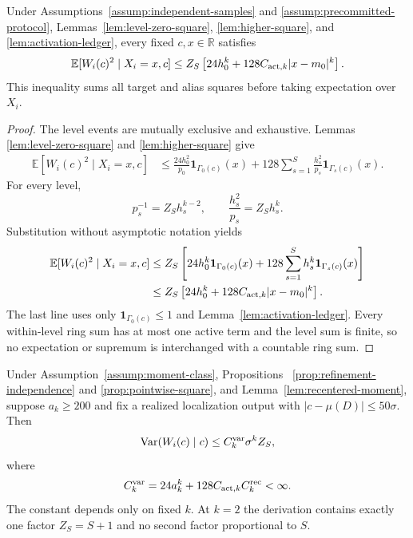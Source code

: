 \begin{proposition}
\label{prop:pointwise-square}
Under Assumptions~\ref{assump:independent-samples} and
\ref{assump:precommitted-protocol}, Lemmas~\ref{lem:level-zero-square},
\ref{lem:higher-square}, and \ref{lem:activation-ledger}, every fixed
$c,x\in\mathbb R$ satisfies
\[
 \mathbb E[W_i(c)^2\mid X_i=x,c]
 \leq Z_S\left[24h_0^k+128C_{{\rm act},k}|x-m_0|^k\right].
\]
This inequality sums all target and alias squares before taking expectation
over $X_i$.
\end{proposition}

\begin{proof}
The level events are mutually exclusive and exhaustive.  Lemmas~
\ref{lem:level-zero-square} and \ref{lem:higher-square} give
\[
\begin{aligned}
 \mathbb E[W_i(c)^2\mid X_i=x,c]
 &\leq\frac{24h_0^2}{p_0}\mathbf1_{\Gamma_0(c)}(x)
 +128\sum_{s=1}^S\frac{h_s^2}{p_s}
   \mathbf1_{\Gamma_s(c)}(x).
\end{aligned}
\]
For every level,
\[
 p_s^{-1}=Z_Sh_s^{k-2},
 \qquad \frac{h_s^2}{p_s}=Z_Sh_s^k.
\]
Substitution without asymptotic notation yields
\[
\begin{aligned}
 \mathbb E[W_i(c)^2\mid X_i=x,c]
 &\leq Z_S\left[24h_0^k\mathbf1_{\Gamma_0(c)}(x)
 +128\sum_{s=1}^S h_s^k\mathbf1_{\Gamma_s(c)}(x)\right]\\
 &\leq Z_S\left[24h_0^k
 +128C_{{\rm act},k}|x-m_0|^k\right].
\end{aligned}
\]
The last line uses only $\mathbf1_{\Gamma_0(c)}\leq1$ and
Lemma~\ref{lem:activation-ledger}.  Every within-level ring sum has at most
one active term and the level sum is finite, so no expectation or supremum is
interchanged with a countable ring sum.
\end{proof}

\begin{proposition}
\label{prop:conditional-variance}
Under Assumption~\ref{assump:moment-class}, Propositions~
\ref{prop:refinement-independence} and \ref{prop:pointwise-square}, and
Lemma~\ref{lem:recentered-moment}, suppose $a_k\geq200$ and fix a realized
localization output with $|c-\mu(D)|\leq50\sigma$.  Then
\[
 \operatorname{Var}(W_i(c)\mid c)
 \leq C_k^{\rm var}\sigma^kZ_S,
\]
where
\[
 C_k^{\rm var}=24a_k^k+128C_{{\rm act},k}C_k^{\rm rec}<\infty.
\]
The constant depends only on fixed $k$.  At $k=2$ the derivation contains
exactly one factor $Z_S=S+1$ and no second factor proportional to $S$.
\end{proposition}

